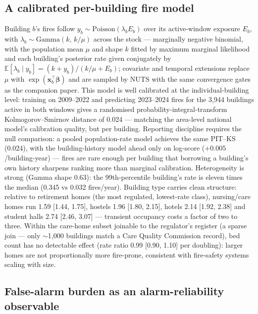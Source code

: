 \documentclass[11pt]{article}
\begin{document}
\subsection{A calibrated per-building fire model}

Building $b$'s fires follow
$y_b \sim \mathrm{Poisson}(\lambda_b E_b)$ over its active-window exposure
$E_b$, with $\lambda_b \sim \mathrm{Gamma}(k,\, k/\mu)$ across the stock ---
marginally negative binomial, with the population mean $\mu$ and shape $k$
fitted by maximum marginal likelihood and each building's posterior rate given
conjugately by $\mathbb{E}[\lambda_b \mid y_b] = (k + y_b)/(k/\mu + E_b)$;
covariate and temporal extensions replace $\mu$ with
$\exp(\mathbf{x}_b^{\top}\boldsymbol\beta)$ and are sampled by NUTS with the
same convergence gates as the companion paper. This model is well calibrated at
the individual-building level: training on
2009--2022 and predicting 2023--2024 fires for the 3{,}944 buildings active in
both windows gives a randomised probability-integral-transform
Kolmogorov--Smirnov distance of 0.024 --- matching the area-level national
model's calibration quality, but per building. Reporting discipline requires
the null comparison: a pooled population-rate model achieves the same PIT--KS
(0.024), with the building-history model ahead only on log-score
($+0.005$/building-year) --- fires are rare enough per building that borrowing
a building's own history sharpens ranking more than marginal calibration. Heterogeneity is strong (Gamma
shape 0.63): the 99th-percentile building's rate is eleven times the median
(0.345 vs 0.032 fires/year). Building type carries clean structure: relative
to retirement homes (the most regulated, lowest-rate class), nursing/care homes
run 1.59 [1.44, 1.75], hostels 1.96 [1.80, 2.15], hotels 2.14 [1.92, 2.38] and
student halls 2.74 [2.46, 3.07] --- transient occupancy costs a factor of two
to three. Within the care-home subset joinable to the regulator's register (a sparse
join --- only $\sim$1{,}000 buildings match a Care Quality Commission
record), bed count has no detectable effect (rate ratio 0.99 [0.90, 1.10] per
doubling):
larger homes are not proportionally more fire-prone, consistent with fire-safety
systems scaling with size.

\subsection{False-alarm burden as an alarm-reliability observable}
\end{document}
